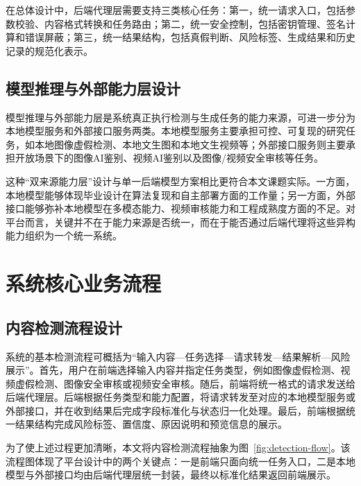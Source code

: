 在总体设计中，后端代理层需要支持三类核心任务：第一，统一请求入口，包括参数校验、内容格式转换和任务路由；第二，统一安全控制，包括密钥管理、签名计算和错误屏蔽；第三，统一结果结构，包括真假判断、风险标签、生成结果和历史记录的规范化表示。

\subsection{模型推理与外部能力层设计}

模型推理与外部能力层是系统真正执行检测与生成任务的能力来源，可进一步分为本地模型服务和外部接口服务两类。本地模型服务主要承担可控、可复现的研究任务，如本地图像虚假检测、本地文生图和本地文生视频等；外部接口服务则主要承担开放场景下的图像AI鉴别、视频AI鉴别以及图像/视频安全审核等任务。

这种“双来源能力层”设计与单一后端模型方案相比更符合本文课题实际。一方面，本地模型能够体现毕业设计在算法复现和自主部署方面的工作量；另一方面，外部接口能够弥补本地模型在多模态能力、视频审核能力和工程成熟度方面的不足。对平台而言，关键并不在于能力来源是否统一，而在于能否通过后端代理将这些异构能力组织为一个统一系统。

\section{系统核心业务流程}

\subsection{内容检测流程设计}

系统的基本检测流程可概括为“输入内容—任务选择—请求转发—结果解析—风险展示”。首先，用户在前端选择输入内容并指定任务类型，例如图像虚假检测、视频虚假检测、图像安全审核或视频安全审核。随后，前端将统一格式的请求发送给后端代理层。后端根据任务类型和能力配置，将请求转发至对应的本地模型服务或外部接口，并在收到结果后完成字段标准化与状态归一化处理。最后，前端根据统一结果结构完成风险标签、置信度、原因说明和预览信息的展示。

为了使上述过程更加清晰，本文将内容检测流程抽象为图~\ref{fig:detection-flow}。该流程图体现了平台设计中的两个关键点：一是前端只面向统一任务入口，二是本地模型与外部接口均由后端代理层统一封装，最终以标准化结果返回前端展示。

